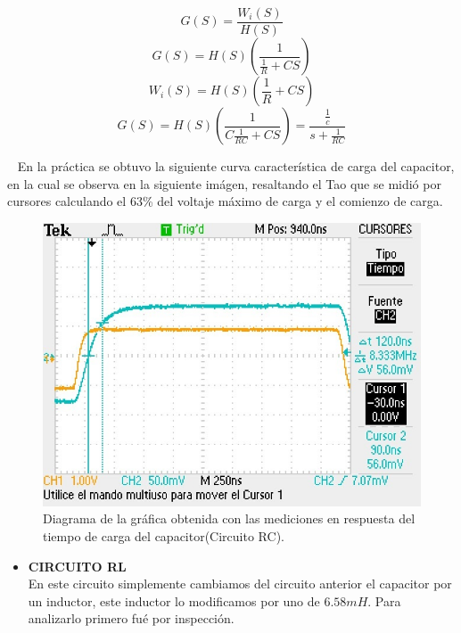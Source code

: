 \documentclass[letterpaper,10pt]{article}
\begin{document}
    \begin{equation}    
    G(S) = \frac{W_i(S)}{H(S)}
    \end{equation}
    \begin{equation}
    G(S) = H(S)(\frac{1}{\frac{1}{R} + CS})
    \end{equation}
	\begin{equation}
	W_i(S) = H(S)(\frac{1}{R} + CS)
	\end{equation}
	 \begin{equation}
	G(S) = H(S)(\frac{1}{C\frac{1}{RC} + CS}) = \frac{\frac{1}{c}}{s+\frac{1}{RC}}
	\end{equation}
    
    En la práctica se obtuvo la siguiente curva característica de carga del capacitor, en la cual se observa en la siguiente imágen, resaltando el Tao que se midió por cursores calculando el 63\%  del voltaje máximo de carga y el comienzo de carga.
    \vspace*{0.2in}
    \begin{figure}[h!]
    	\centering
    	\includegraphics[scale=1.5]{TAOCAP}
    	\caption{Diagrama de la gráfica obtenida con las mediciones en respuesta del tiempo de carga del capacitor(Circuito RC).}
    \end{figure}
    \begin{itemize}
    	\item
    	\textbf{CIRCUITO RL}\vspace*{0.4in}\\
    	En este circuito simplemente cambiamos del circuito anterior el capacitor por un inductor, este inductor lo modificamos por uno de $6.58 mH$.
    	Para analizarlo primero fué por inspección.
    	\end{itemize}
    
\end{document}
